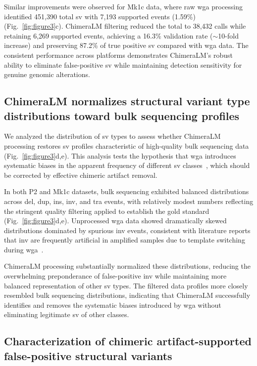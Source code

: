 \documentclass[pdflatex,sn-nature]{sn-jnl}%
\theoremstyle{thmstyleone}%
\theoremstyle{thmstyletwo}%
\theoremstyle{thmstylethree}%
\begin{document}
Similar improvements were observed for Mk1c data, where raw \gls{wga} processing identified 451,390 total \gls{sv} with 7,193 supported events (1.59\%) (Fig.~\ref{fig:figure3}c).
ChimeraLM filtering reduced the total to 38,432 calls while retaining 6,269 supported events, achieving a 16.3\% validation rate ($\sim$10-fold increase) and preserving 87.2\% of true positive \gls{sv} compared with \gls{wga} data.
The consistent performance across platforms demonstrates ChimeraLM's robust ability to eliminate false-positive \gls{sv} while maintaining detection sensitivity for genuine genomic alterations.

\subsection*{ChimeraLM normalizes structural variant type distributions toward bulk sequencing profiles}

We analyzed the distribution of \gls{sv} types to assess whether ChimeraLM processing restores \gls{sv} profiles characteristic of high-quality bulk sequencing data (Fig.~\ref{fig:figure3}d,e).
This analysis tests the hypothesis that \gls{wga} introduces systematic biases in the apparent frequency of different \gls{sv} classes~\cite{lu2023chimera, agyabeng2025evaluating}, which should be corrected by effective chimeric artifact removal.

In both P2 and Mk1c datasets, bulk sequencing exhibited balanced distributions across \gls{del}, \gls{dup}, \gls{ins}, \gls{inv}, and \gls{tra} events, with relatively modest numbers reflecting the stringent quality filtering applied to establish the gold standard (Fig.~\ref{fig:figure3}d,e).
Unprocessed \gls{wga} data showed dramatically skewed distributions dominated by spurious \gls{inv} events, consistent with literature reports that \gls{inv} are frequently artificial in amplified samples due to template switching during \gls{wga}~\cite{lu2023exploration, lu2023chimera}.

ChimeraLM processing substantially normalized these distributions, reducing the overwhelming preponderance of false-positive \gls{inv} while maintaining more balanced representation of other \gls{sv} types.
The filtered data profiles more closely resembled bulk sequencing distributions, indicating that ChimeraLM successfully identifies and removes the systematic biases introduced by \gls{wga} without eliminating legitimate \gls{sv} of other classes.

\subsection*{Characterization of chimeric artifact-supported false-positive structural variants}
\end{document}
